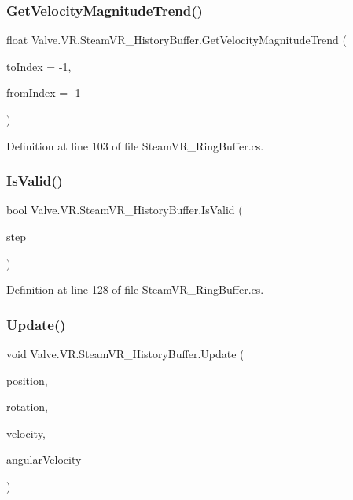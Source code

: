 \subsubsection{\texorpdfstring{GetVelocityMagnitudeTrend()}{GetVelocityMagnitudeTrend()}}
{\footnotesize\ttfamily float Valve.\+V\+R.\+Steam\+V\+R\+\_\+\+History\+Buffer.\+Get\+Velocity\+Magnitude\+Trend (\begin{DoxyParamCaption}\item[{int}]{to\+Index = {\ttfamily -\/1},  }\item[{int}]{from\+Index = {\ttfamily -\/1} }\end{DoxyParamCaption})}



Definition at line 103 of file Steam\+V\+R\+\_\+\+Ring\+Buffer.\+cs.

\mbox{\label{class_valve_1_1_v_r_1_1_steam_v_r___history_buffer_a63cc4137c712355bbd6b699f42bc51c0}} 
\subsubsection{\texorpdfstring{IsValid()}{IsValid()}}
{\footnotesize\ttfamily bool Valve.\+V\+R.\+Steam\+V\+R\+\_\+\+History\+Buffer.\+Is\+Valid (\begin{DoxyParamCaption}\item[{\mbox{\hyperlink{class_valve_1_1_v_r_1_1_steam_v_r___history_step}{Steam\+V\+R\+\_\+\+History\+Step}}}]{step }\end{DoxyParamCaption})}



Definition at line 128 of file Steam\+V\+R\+\_\+\+Ring\+Buffer.\+cs.

\mbox{\label{class_valve_1_1_v_r_1_1_steam_v_r___history_buffer_a7f39197b726b9b71ed14c0f065a08849}} 
\subsubsection{\texorpdfstring{Update()}{Update()}}
{\footnotesize\ttfamily void Valve.\+V\+R.\+Steam\+V\+R\+\_\+\+History\+Buffer.\+Update (\begin{DoxyParamCaption}\item[{Vector3}]{position,  }\item[{Quaternion}]{rotation,  }\item[{Vector3}]{velocity,  }\item[{Vector3}]{angular\+Velocity }\end{DoxyParamCaption})}



